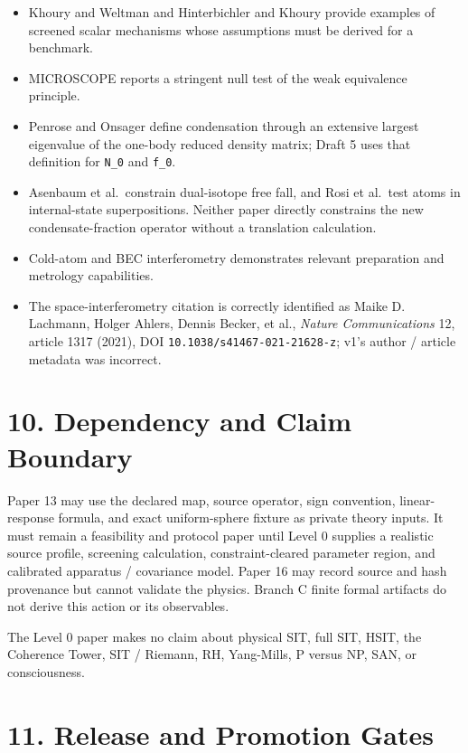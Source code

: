 \documentclass[
  american,
  11pt,
  letterpaper,
]{article}
\providecommand{\tightlist}{%
  \setlength{\itemsep}{0pt}\setlength{\parskip}{0pt}}
\begin{document}
\begin{itemize}
\tightlist
\item
  Khoury and Weltman and Hinterbichler and Khoury provide examples of screened scalar mechanisms whose assumptions must be derived for a benchmark.
\item
  MICROSCOPE reports a stringent null test of the weak equivalence principle.
\item
  Penrose and Onsager define condensation through an extensive largest eigenvalue of the one-body reduced density matrix; Draft 5 uses that definition for \texttt{N\_0} and \texttt{f\_0}.
\item
  Asenbaum et al.~constrain dual-isotope free fall, and Rosi et al.~test atoms in internal-state superpositions. Neither paper directly constrains the new condensate-fraction operator without a translation calculation.
\item
  Cold-atom and BEC interferometry demonstrates relevant preparation and metrology capabilities.
\item
  The space-interferometry citation is correctly identified as Maike D. Lachmann, Holger Ahlers, Dennis Becker, et al., \emph{Nature Communications} 12, article 1317 (2021), DOI \nolinkurl{10.1038/s41467-021-21628-z}; v1's author / article metadata was incorrect.
\end{itemize}

\section{10. Dependency and Claim Boundary}\label{dependency-and-claim-boundary}

Paper 13 may use the declared map, source operator, sign convention, linear-response formula, and exact uniform-sphere fixture as private theory inputs. It must remain a feasibility and protocol paper until Level 0 supplies a realistic source profile, screening calculation, constraint-cleared parameter region, and calibrated apparatus / covariance model. Paper 16 may record source and hash provenance but cannot validate the physics. Branch C finite formal artifacts do not derive this action or its observables.

The Level 0 paper makes no claim about physical SIT, full SIT, HSIT, the Coherence Tower, SIT / Riemann, RH, Yang-Mills, P versus NP, SAN, or consciousness.

\section{11. Release and Promotion Gates}\label{release-and-promotion-gates}
\end{document}
